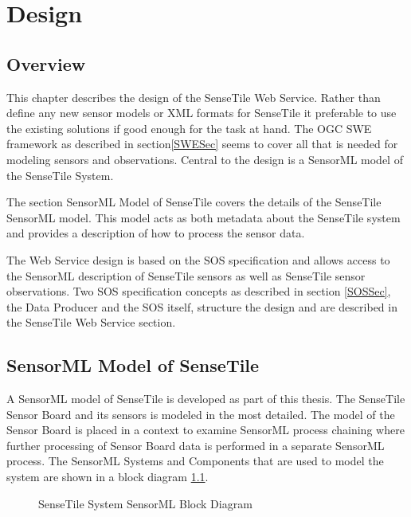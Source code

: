 \documentclass[]{final_report}
\begin{document}
\chapter{Design}
\section{Overview}
This chapter describes the design of the SenseTile Web Service. Rather than define any new sensor models or XML formats for SenseTile it preferable to use the existing solutions if good enough for the task at hand. The OGC SWE framework as described in section\ref{SWESec} seems to cover all that is needed for modeling sensors and observations. Central to the design is a SensorML model of the SenseTile System. 

The section SensorML Model of SenseTile covers the details of the SenseTile SensorML model. This model acts as both metadata about the SenseTile system and provides a description of how to process the sensor data.

The Web Service design is based on the SOS specification and allows access to the SensorML description of SenseTile sensors as well as SenseTile sensor observations. Two SOS specification concepts as described in section \ref{SOSSec}, the Data Producer and the SOS itself, structure the design and are described in the SenseTile Web Service section.

\section{SensorML Model of SenseTile}\label{SenseTileModelSec}

A SensorML model of SenseTile is developed as part of this thesis. The SenseTile Sensor Board and its sensors is modeled in the most detailed. The model of the Sensor Board is placed in a context to examine SensorML process chaining where further processing of Sensor Board data is performed in a separate SensorML process. The SensorML Systems and Components that are used to model the system are shown in a block diagram \ref{fig:SensorML_SenseTile_System_comp}.

\begin{figure}[h]
\centering
{}
\caption{SenseTile System SensorML Block Diagram}\label{fig:SensorML_SenseTile_System_comp}
\end{figure}
\end{document}
